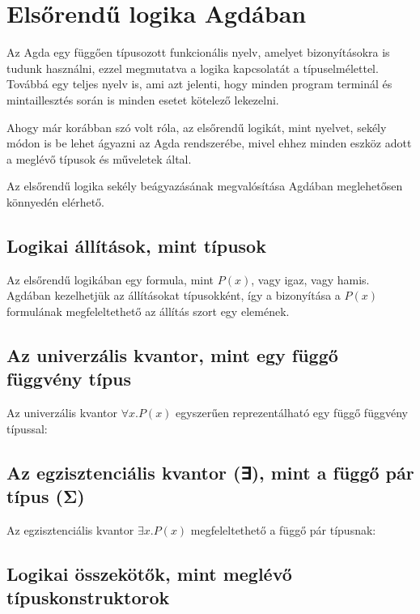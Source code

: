 \section{Elsőrendű logika Agdában}

Az Agda egy függően típusozott funkcionális nyelv, amelyet bizonyításokra is tudunk használni, ezzel megmutatva a logika kapcsolatát a típuselmélettel. Továbbá egy teljes nyelv is, ami azt jelenti, hogy minden program terminál és mintaillesztés során is minden esetet kötelező lekezelni.

Ahogy már korábban szó volt róla, az elsőrendű logikát, mint nyelvet, sekély módon is be lehet ágyazni az Agda rendszerébe, mivel ehhez minden eszköz adott a meglévő típusok és műveletek által.

Az elsőrendű logika sekély beágyazásának megvalósítása Agdában meglehetősen könnyedén elérhető.

\subsection{Logikai állítások, mint típusok}

Az elsőrendű logikában egy formula, mint $ P(x) $, vagy igaz, vagy hamis. Agdában kezelhetjük az állításokat típusokként, így a bizonyítása a $ P(x) $ formulának megfeleltethető az állítás szort egy elemének.

\subsection{Az univerzális kvantor, mint egy függő függvény típus}

Az univerzális kvantor $ ∀ x. P(x) $ egyszerűen reprezentálható egy függő függvény típussal:

\miscUniversalQuantifier

\subsection{Az egzisztenciális kvantor (∃), mint a függő pár típus (Σ)}

Az egzisztenciális kvantor $ ∃ x. P(x) $ megfeleltethető a függő pár típusnak:

\miscExistentialQuantifier

\subsection{Logikai összekötők, mint meglévő típuskonstruktorok}

